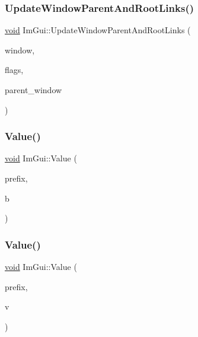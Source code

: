 \mbox{\label{namespaceImGui_a85d7262320ed7ce8e40863b99f8db4a3}} 
\subsubsection{\texorpdfstring{Update\+Window\+Parent\+And\+Root\+Links()}{UpdateWindowParentAndRootLinks()}}
{\footnotesize\ttfamily \hyperlink{imgui__impl__opengl3__loader_8h_ac668e7cffd9e2e9cfee428b9b2f34fa7}{void} Im\+Gui\+::\+Update\+Window\+Parent\+And\+Root\+Links (\begin{DoxyParamCaption}\item[{\hyperlink{structImGuiWindow}{Im\+Gui\+Window} $\ast$}]{window,  }\item[{Im\+Gui\+Window\+Flags}]{flags,  }\item[{\hyperlink{structImGuiWindow}{Im\+Gui\+Window} $\ast$}]{parent\+\_\+window }\end{DoxyParamCaption})}

\mbox{\label{namespaceImGui_a1b3324308e43eeded5c3599fa0f03e85}} 
\subsubsection{\texorpdfstring{Value()}{Value()}\hspace{0.1cm}{\footnotesize\ttfamily [1/4]}}
{\footnotesize\ttfamily \hyperlink{imgui__impl__opengl3__loader_8h_ac668e7cffd9e2e9cfee428b9b2f34fa7}{void} Im\+Gui\+::\+Value (\begin{DoxyParamCaption}\item[{const char $\ast$}]{prefix,  }\item[{bool}]{b }\end{DoxyParamCaption})}

\mbox{\label{namespaceImGui_a654ceb70f2dd1598f88861f54764ee08}} 
\subsubsection{\texorpdfstring{Value()}{Value()}\hspace{0.1cm}{\footnotesize\ttfamily [2/4]}}
{\footnotesize\ttfamily \hyperlink{imgui__impl__opengl3__loader_8h_ac668e7cffd9e2e9cfee428b9b2f34fa7}{void} Im\+Gui\+::\+Value (\begin{DoxyParamCaption}\item[{const char $\ast$}]{prefix,  }\item[{int}]{v }\end{DoxyParamCaption})}

